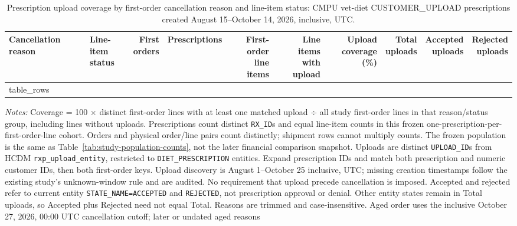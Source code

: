 \begin{table}[!htbp]
\centering
\caption{Prescription upload coverage by first-order cancellation reason and line-item status: CMPU vet-diet CUSTOMER\_UPLOAD prescriptions created August 15--October 14, 2026, inclusive, UTC.}
\label{tab:study-upload-coverage-by-cancellation-reason}
\small
\setlength{\tabcolsep}{6pt}
\begin{tabular}{@{}llrrrrrrrr@{}}
\toprule
Cancellation reason & \shortstack{Line-item\\status} & \shortstack{First\\orders} & Prescriptions & \shortstack{First-order\\line items} & \shortstack{Line items\\with upload} & \shortstack{Upload\\coverage (\%)} & \shortstack{Total\\uploads} & \shortstack{Accepted\\uploads} & \shortstack{Rejected\\uploads} \\
\midrule
{{ table_rows }}
\bottomrule
\end{tabular}
\begin{minipage}{\linewidth}
\footnotesize
\textit{Notes:} Coverage = 100 $\times$ distinct first-order lines with at least
one matched upload $\div$ all study first-order lines in that reason/status group, including
lines without uploads. Prescriptions count distinct \texttt{RX\_ID}s and equal
line-item counts in this frozen one-prescription-per-first-order-line cohort.
Orders and physical order/line pairs count distinctly;
shipment rows cannot multiply counts. The frozen population is the same as
Table~\ref{tab:study-population-counts}, not the later financial comparison snapshot.
Uploads are distinct \texttt{UPLOAD\_ID}s from HCDM
\texttt{rxp\_upload\_entity}, restricted to \texttt{DIET\_PRESCRIPTION} entities.
Expand prescription IDs and match both prescription and numeric customer IDs,
then both first-order keys. Upload discovery is August 1--October 25 inclusive,
UTC; missing creation timestamps follow the existing study's unknown-window rule
and are audited. No requirement that upload precede cancellation is imposed.
Accepted and rejected refer to current entity \texttt{STATE\_NAME=ACCEPTED} and
\texttt{REJECTED}, not prescription approval or denial. Other entity states
remain in Total uploads, so Accepted plus Rejected need not equal Total.
Reasons are trimmed and case-insensitive. Aged order uses the inclusive
October 27, 2026, 00:00 UTC cancellation cutoff; later or undated aged reasons

\end{minipage}
\end{table}
